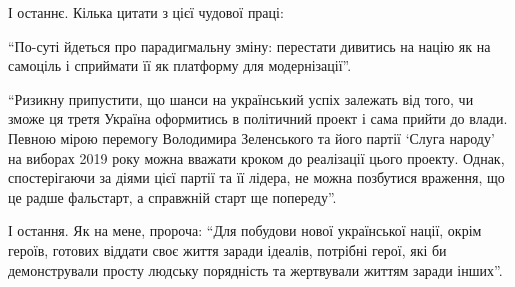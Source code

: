 І останнє. Кілька цитати з цієї чудової праці:

\enquote{По-суті йдеться про парадигмальну зміну: перестати дивитись на націю як на
самоціль і сприймати її як платформу для модернізації}.

\enquote{Ризикну припустити, що шанси на український успіх залежать від того, чи зможе
ця третя Україна оформитись в політичний проект і сама прийти до влади. Певною
мірою перемогу Володимира Зеленського та його партії \enquote{Слуга народу} на виборах
2019 року можна вважати кроком до реалізації цього проекту. Однак,
спостерігаючи за діями цієї партії та її лідера, не можна позбутися враження,
що це радше фальстарт, а справжній старт ще попереду}.

І остання. Як на мене, пророча: \enquote{Для побудови нової української нації, окрім
героїв, готових віддати своє життя заради ідеалів, потрібні герої, які би
демонстрували просту людську порядність та жертвували життям заради інших}.
